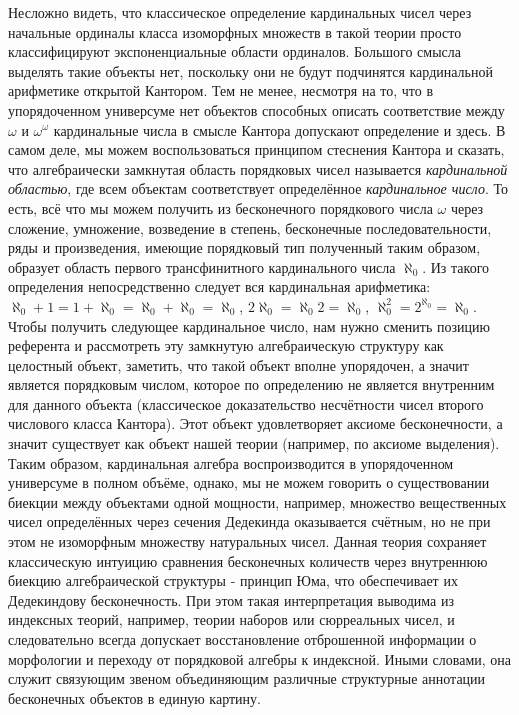 \documentclass[12pt]{article}
\begin{document}
Несложно видеть, что классическое определение кардинальных чисел через начальные ординалы класса изоморфных множеств в такой теории просто классифицируют экспоненциальные области ординалов. Большого смысла выделять такие объекты нет, поскольку они не будут подчинятся кардинальной арифметике открытой Кантором. Тем не менее, несмотря на то, что в упорядоченном универсуме нет объектов способных описать соответствие между $\omega$ и $\omega^{\omega}$ кардинальные числа в смысле Кантора допускают определение и здесь. В самом деле, мы можем воспользоваться принципом стеснения Кантора и сказать, что алгебраически замкнутая область порядковых чисел называется {\it кардинальной областью}, где всем объектам соответствует определённое {\it кардинальное число}. То есть, всё что мы можем получить из бесконечного порядкового числа $\omega$ через сложение, умножение, возведение в степень, бесконечные последовательности, ряды и произведения, имеющие порядковый тип полученный таким образом, образует область первого трансфинитного кардинального числа $\aleph_0$. Из такого определения непосредственно следует вся кардинальная арифметика: $\aleph_0 + 1 = 1 + \aleph_0 = \aleph_0 + \aleph_0 = \aleph_0$, $2\aleph_0 = \aleph_0 2 = \aleph_0$, $\aleph_0^2 = 2^{\aleph_0} = \aleph_0$. Чтобы получить следующее кардинальное число, нам нужно сменить позицию референта и рассмотреть эту замкнутую алгебраическую структуру как целостный объект, заметить, что такой объект вполне упорядочен, а значит является порядковым числом, которое по определению не является внутренним для данного объекта (классическое доказательство несчётности чисел второго числового класса Кантора). Этот объект удовлетворяет аксиоме бесконечности, а значит существует как объект нашей теории (например, по аксиоме выделения). Таким образом, кардинальная алгебра воспроизводится в упорядоченном универсуме в полном объёме, однако, мы не можем говорить о существовании биекции между объектами одной мощности, например, множество вещественных чисел определённых через сечения Дедекинда оказывается счётным, но не при этом не изоморфным множеству натуральных чисел. Данная теория сохраняет классическую интуицию сравнения бесконечных количеств через внутреннюю биекцию алгебраической структуры - принцип Юма, что обеспечивает их Дедекиндову бесконечность. При этом такая интерпретация выводима из индексных теорий, например, теории наборов или сюрреальных чисел, и следовательно всегда допускает восстановление отброшенной информации о морфологии и переходу от порядковой алгебры к индексной. Иными словами, она служит связующим звеном объединяющим различные структурные аннотации бесконечных объектов в единую картину.
\end{document}
